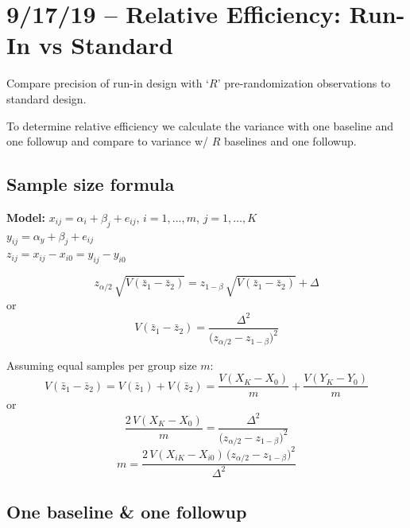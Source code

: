 \documentclass[11pt]{article}
\newcommand{\marginmark}[1]{%
  \begin{mdframed}[linewidth=0.5pt,innertopmargin=4pt,
    innerbottommargin=4pt]
  \small #1
  \end{mdframed}}
\begin{document}
\newpage
\section{9/17/19 -- Relative Efficiency: Run-In vs Standard}

Compare precision of run-in design with `$R$'
pre-randomization observations to standard design.

To determine relative efficiency we calculate the
variance with one baseline and one followup and compare
to variance w/ $R$ baselines and one followup.

\subsection*{Sample size formula}

\marginmark{%
  \textbf{Model:}
  $x_{ij} = \alpha_i + \beta_j + e_{ij}$,
  \quad $i = 1,\ldots,m$, \; $j = 1,\ldots,K$ \\[4pt]
  $y_{ij} = \alpha_y + \beta_j + e_{ij}$ \\[4pt]
  $z_{ij} = x_{ij} - x_{i0} = y_{ij} - y_{i0}$}

\begin{equation}
  z_{\alpha/2}\,\sqrt{V(\bar{z}_1 - \bar{z}_2)}
  = z_{1-\beta}\,\sqrt{V(\bar{z}_1 - \bar{z}_2)} + \Delta
\end{equation}
or
\begin{equation}
  V(\bar{z}_1 - \bar{z}_2)
  = \frac{\Delta^2}
    {\bigl(z_{\alpha/2} - z_{1-\beta}\bigr)^2}
\end{equation}

Assuming equal samples per group size $m$:
\begin{equation}
  V(\bar{z}_1 - \bar{z}_2)
  = V(\bar{z}_1) + V(\bar{z}_2)
  = \frac{V(X_K - X_0)}{m}
    + \frac{V(Y_K - Y_0)}{m}
\end{equation}
or
\begin{equation}
  \frac{2\,V(X_K - X_0)}{m}
  = \frac{\Delta^2}
    {\bigl(z_{\alpha/2} - z_{1-\beta}\bigr)^2}
\end{equation}
\begin{equation}
  m = \frac{2\,V(X_{iK} - X_{i0})\,
    \bigl(z_{\alpha/2} - z_{1-\beta}\bigr)^2}
    {\Delta^2}
\end{equation}

\subsection*{One baseline \& one followup}
\end{document}
